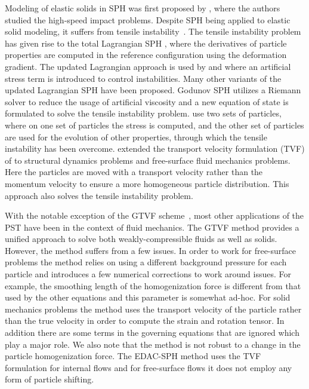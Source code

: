 Modeling of elastic solids in SPH was first proposed by
\cite{libersky1991smooth}, where the authors studied the high-speed impact
problems. Despite SPH being applied to elastic solid modeling, it suffers from
tensile instability~\citep{swegle1995smoothed}. The tensile instability problem
has given rise to the total Lagrangian SPH \citep{belytschko2000unified,
  bonet2002alternative, vignjevic2006sph}, where the derivatives of particle
properties are computed in the reference configuration using the deformation
gradient. The updated Lagrangian approach is used by \cite{gray2001sph} and
\cite{monaghan2000sph} where an artificial stress term is introduced to control
instabilities. Many other variants of the updated Lagrangian SPH have been
proposed. Godunov SPH \citep{sugiura2017extension} utilizes a Riemann solver to
reduce the usage of artificial viscosity and a new equation of state is
formulated to solve the tensile instability problem. \cite{dyka1995approach} use
two sets of particles, where on one set of particles the stress is computed, and
the other set of particles are used for the evolution of other properties,
through which the tensile instability has been overcome.
\cite{zhang2017generalized} extended the transport velocity formulation (TVF) of
\cite{adami2013transport} to structural dynamics problems and free-surface fluid
mechanics problems. Here the particles are moved with a transport velocity
rather than the momentum velocity to ensure a more homogeneous particle
distribution. This approach also solves the tensile instability problem.

With the notable exception of the GTVF scheme~\citep{zhang_hu_adams17}, most
other applications of the PST have been in the context of fluid mechanics. The
GTVF method provides a unified approach to solve both weakly-compressible fluids
as well as solids. However, the method suffers from a few issues. In order to
work for free-surface problems the method relies on using a different background
pressure for each particle and introduces a few numerical corrections to work
around issues. For example, the smoothing length of the homogenization force is
different from that used by the other equations and this parameter is somewhat
ad-hoc. For solid mechanics problems the method uses the transport velocity of
the particle rather than the true velocity in order to compute the strain and
rotation tensor. In addition there are some terms in the governing equations
that are ignored which play a major role. We also note that the method is not
robust to a change in the particle homogenization force. The EDAC-SPH method
uses the TVF formulation for internal flows and for free-surface flows it does
not employ any form of particle shifting.

